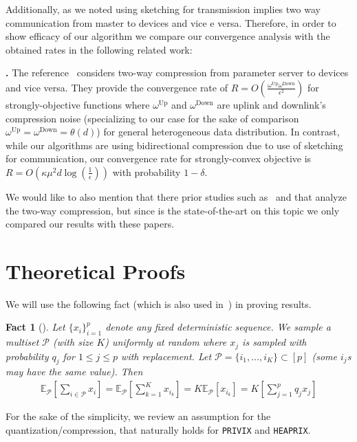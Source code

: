\documentclass[sigconf, anonymous, review]{acmart}
\newtheorem{fact}[theorem]{Fact}
\begin{document}
Additionally, as we noted using sketching for transmission implies two way communication from master to devices and vice e versa. Therefore, in order to show efficacy of our algorithm we compare our convergence analysis with the obtained rates in the following related work:

\textbf{\citep{philippenko2020artemis}.} 
The reference~\citep{philippenko2020artemis} considers two-way compression from parameter server to devices and vice versa. They provide the convergence rate of $R=O\left(\frac{\omega^{\text{Up}}\omega^{\text{Down}}}{\epsilon^2}\right)$ for strongly-objective functions where $\omega^{\text{Up}}$ and $\omega^{\text{Down}}$ are uplink and downlink's compression noise (specializing to our case for the sake of comparison $\omega^{\text{Up}}=\omega^{\text{Down}}=\theta\left(d\right)$) for general heterogeneous data distribution. In contrast, while our algorithms are using bidirectional compression due to use of sketching for communication, our convergence rate for strongly-convex objective is $R=O(\kappa\mu^2d\log\left(\frac{1}{\epsilon}\right))$ with probability $1-\delta$.  

We would like to also mention that there prior studies such as~ \citep{tang2019doublesqueeze} and \citep{zheng2019communication} that analyze the two-way compression, but since \citep{philippenko2020artemis} is the state-of-the-art on this topic we only compared our results with these papers.


\clearpage

\section{Theoretical Proofs}\label{app:proofs}



We will use the following fact (which is also used in~\citep{li2019convergence,haddadpour2019convergence}) in proving results.
\begin{fact}[\citep{li2019convergence,haddadpour2019convergence}]\label{fact:1}
Let
$\{x_i\}_{i=1}^p$ denote any fixed deterministic sequence. We sample a multiset $\mathcal{P}$ (with size $K$) uniformly at random where $x_j$ is sampled  with probability $q_j$ for $1\leq j\leq p$ with replacement.  Let $\mathcal{P} = \{i_1,\ldots, i_K\} \subset[p]$ (some $i_j$s may have the same value). Then
\begin{align}
    \mathbb{E}_{\mathcal{P}}\left[\sum_{i\in \mathcal{P}}x_i\right]=\mathbb{E}_{\mathcal{P}}\left[\sum_{k=1}^Kx_{i_k}\right]=K\mathbb{E}_{\mathcal{P}}\left[x_{i_k}\right]=K\left[\sum_{j=1}^pq_jx_j\right]
\end{align}
\end{fact}
For the sake of the simplicity, we review an assumption for the quantization/compression, that naturally holds for \texttt{PRIVIX} and \texttt{HEAPRIX}.
\end{document}
